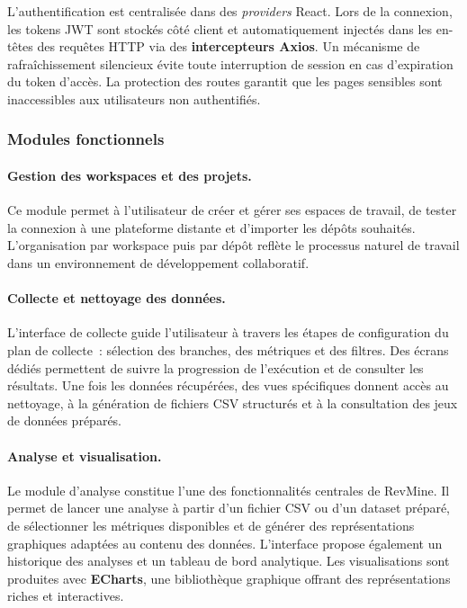 L'authentification est centralisée dans des \textit{providers} React. Lors de la connexion, les
tokens JWT sont stockés côté client et automatiquement injectés dans les en-têtes des requêtes
HTTP via des \textbf{intercepteurs Axios}. Un mécanisme de rafraîchissement silencieux évite toute
interruption de session en cas d'expiration du token d'accès. La protection des routes garantit
que les pages sensibles sont inaccessibles aux utilisateurs non authentifiés.

\subsubsection{Modules fonctionnels}

\paragraph{Gestion des workspaces et des projets.} Ce module permet à l'utilisateur de créer et
gérer ses espaces de travail, de tester la connexion à une plateforme distante et d'importer les
dépôts souhaités. L'organisation par workspace puis par dépôt reflète le processus naturel de
travail dans un environnement de développement collaboratif.

\paragraph{Collecte et nettoyage des données.} L'interface de collecte guide l'utilisateur à
travers les étapes de configuration du plan de collecte~: sélection des branches, des métriques
et des filtres. Des écrans dédiés permettent de suivre la progression de l'exécution et de
consulter les résultats. Une fois les données récupérées, des vues spécifiques donnent accès au
nettoyage, à la génération de fichiers CSV structurés et à la consultation des jeux de données
préparés.

\paragraph{Analyse et visualisation.} Le module d'analyse constitue l'une des fonctionnalités
centrales de RevMine. Il permet de lancer une analyse à partir d'un fichier CSV ou d'un dataset
préparé, de sélectionner les métriques disponibles et de générer des représentations graphiques
adaptées au contenu des données. L'interface propose également un historique des analyses et un
tableau de bord analytique. Les visualisations sont produites avec \textbf{ECharts}, une
bibliothèque graphique offrant des représentations riches et interactives.


